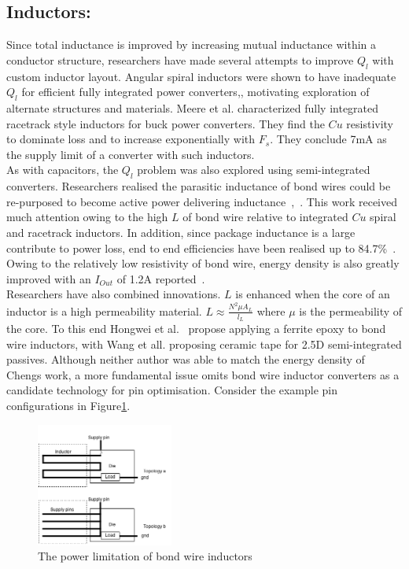 \documentclass[letterpaper,twocolumn,10pt]{article}
\begin{document}
\subsection{Inductors: }Since total inductance is improved by increasing mutual inductance within a conductor structure, researchers have made several attempts to improve $Q_l$ with custom inductor layout. Angular spiral inductors were shown to have inadequate $Q_l$ for efficient fully integrated power converters\cite{Alimadadi2008},\cite{Artillan2011}, motivating exploration of alternate structures and materials. Meere et al. \cite{Meere2009} characterized fully integrated racetrack style inductors for buck power converters. They find the $Cu$ resistivity to dominate loss and to increase exponentially with $F_s$. They conclude 7mA as the supply limit of a converter with such inductors.\\
As with capacitors, the $Q_l$ problem was also explored using semi-integrated converters. Researchers realised the parasitic inductance of bond wires could be re-purposed to become active power delivering inductance~\cite{Wens2007},~\cite{Ahn2012}. This work received much attention owing to the high $L$ of bond wire relative to integrated $Cu$ spiral and racetrack inductors. In addition, since package inductance is a large contribute to power loss, end to end efficiencies have been realised up to 84.7\%~\cite{Cheng2013}. Owing to the relatively low resistivity of bond wire, energy density is also greatly improved with an $I_{Out}$ of 1.2A reported~\cite{Cheng2013}.\\
\indent Researchers have also combined innovations. $L$ is enhanced when the core of an inductor is a high permeability material. $L \approx \frac{N^2\mu A_L}{l_L}$ where $\mu$ is the permeability of the core. To this end Hongwei et al.~\cite{Hongwei2011} propose applying a ferrite epoxy to bond wire inductors, with Wang et all. proposing ceramic tape for 2.5D semi-integrated passives. Although neither author was able to match the energy density of Chengs work, a more fundamental issue omits bond wire inductor converters as a candidate technology for pin optimisation. Consider the example pin configurations in Figure\ref{BondWireLim}.
    
\begin{figure}[here]
\includegraphics[width=0.4\textwidth]{CostvsGainofBondWireInductor}
\caption{The power limitation of bond wire inductors}
\label{BondWireLim}
\end{figure}
\end{document}
